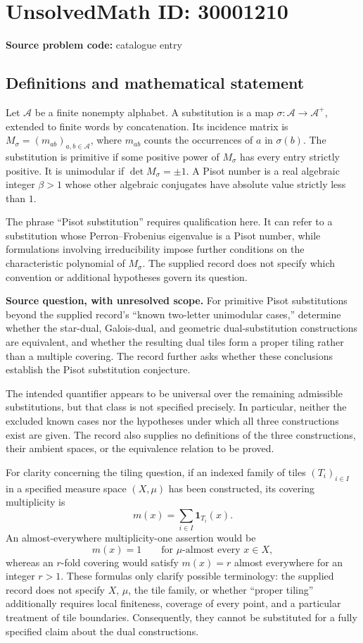 \documentclass[11pt]{article}
\begin{document}
\section*{UnsolvedMath ID: 30001210}
\textbf{Source problem code:} catalogue entry
\subsection{Definitions and mathematical statement}
Let \(\mathcal A\) be a finite nonempty alphabet. A substitution is a map \(\sigma:\mathcal A\to\mathcal A^{+}\), extended to finite words by concatenation. Its incidence matrix is \(M_\sigma=(m_{ab})_{a,b\in\mathcal A}\), where \(m_{ab}\) counts the occurrences of \(a\) in \(\sigma(b)\). The substitution is primitive if some positive power of \(M_\sigma\) has every entry strictly positive. It is unimodular if \(\det M_\sigma=\pm1\). A Pisot number is a real algebraic integer \(\beta>1\) whose other algebraic conjugates have absolute value strictly less than \(1\).

The phrase ``Pisot substitution'' requires qualification here. It can refer to a substitution whose Perron--Frobenius eigenvalue is a Pisot number, while formulations involving irreducibility impose further conditions on the characteristic polynomial of \(M_\sigma\). The supplied record does not specify which convention or additional hypotheses govern its question.

\textbf{Source question, with unresolved scope.} For primitive Pisot substitutions beyond the supplied record's ``known two-letter unimodular cases,'' determine whether the star-dual, Galois-dual, and geometric dual-substitution constructions are equivalent, and whether the resulting dual tiles form a proper tiling rather than a multiple covering. The record further asks whether these conclusions establish the Pisot substitution conjecture.

The intended quantifier appears to be universal over the remaining admissible substitutions, but that class is not specified precisely. In particular, neither the excluded known cases nor the hypotheses under which all three constructions exist are given. The record also supplies no definitions of the three constructions, their ambient spaces, or the equivalence relation to be proved.

For clarity concerning the tiling question, if an indexed family of tiles \((T_i)_{i\in I}\) in a specified measure space \((X,\mu)\) has been constructed, its covering multiplicity is
\[
 m(x)=\sum_{i\in I}\mathbf 1_{T_i}(x).
\]
An almost-everywhere multiplicity-one assertion would be
\[
 m(x)=1\qquad\text{for \(\mu\)-almost every }x\in X,
\]
whereas an \(r\)-fold covering would satisfy \(m(x)=r\) almost everywhere for an integer \(r>1\). These formulas only clarify possible terminology: the supplied record does not specify \(X\), \(\mu\), the tile family, or whether ``proper tiling'' additionally requires local finiteness, coverage of every point, and a particular treatment of tile boundaries. Consequently, they cannot be substituted for a fully specified claim about the dual constructions.
\end{document}
